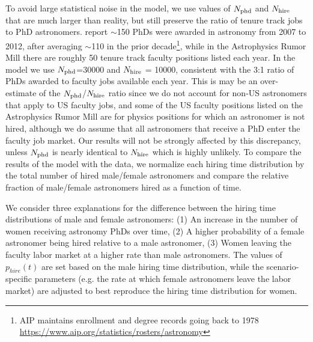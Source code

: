 \documentclass[modern]{aastex62}
\begin{document}
To avoid large statistical noise in the model, we use values of $N_{\rm phd}$ and $N_{\rm hire}$ that are much larger than reality, but still preserve the ratio of tenure track jobs to PhD astronomers. \citet{mul14} report $\sim$150 PhDs were awarded in astronomy from 2007 to 2012, after averaging $\sim$110 in the prior decade\footnote{AIP maintains enrollment and degree records going back to 1978 \url{https://www.aip.org/statistics/rosters/astronomy}}, while in the Astrophysics Rumor Mill there are roughly 50 tenure track faculty positions listed each year. In the model we use $N_{\rm phd}$=30000 and $N_{\rm hire}$ = 10000, consistent with the 3:1 ratio of PhDs awarded to faculty jobs available each year. This is may be an over-estimate of the $N_{\rm phd}$/$N_{\rm hire}$ ratio since we do not account for non-US astronomers that apply to US faculty jobs, and some of the US faculty positions listed on the Astrophysics Rumor Mill are for physics positions for which an astronomer is not hired, although we do assume that all astronomers that receive a PhD enter the faculty job market. Our results will not be strongly affected by this discrepancy, unless $N_{\rm phd}$ is nearly identical to $N_{\rm hire}$ which is highly unlikely. To compare the results of the model with the data, we normalize each hiring time distribution by the total number of hired male/female astronomers and compare the relative fraction of male/female astronomers hired as a function of time. 

We consider three explanations for the difference between the hiring time distributions of male and female astronomers: (1) An increase in the number of women receiving astronomy PhDs over time, (2) A higher probability of a female astronomer being hired relative to a male astronomer, (3) Women leaving the faculty labor market at a higher rate than male astronomers. The values of $p_{hire}(t)$ are set based on the male hiring time distribution, while the scenario-specific parameters (e.g. the rate at which female astronomers leave the labor market) are adjusted to best reproduce the hiring time distribution for women. 
\end{document}

